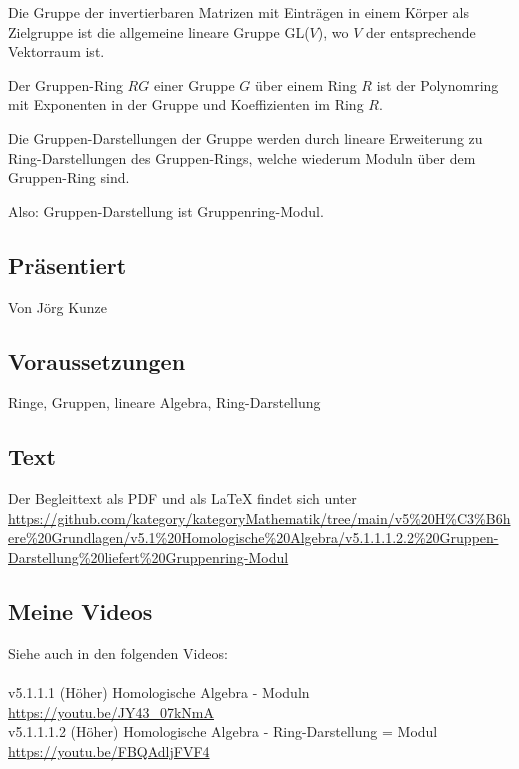 \documentclass[a4paper]{amsart}
\theoremstyle{definition}
\begin{document}
Die Gruppe der invertierbaren Matrizen mit Einträgen in einem Körper als Zielgruppe ist die allgemeine lineare Gruppe GL($V$), wo $V$ der entsprechende Vektorraum ist.

Der Gruppen-Ring $RG$ einer Gruppe $G$ über einem Ring $R$ ist der Polynomring mit Exponenten in der Gruppe und Koeffizienten im Ring $R$.

Die Gruppen-Darstellungen der Gruppe werden durch lineare Erweiterung zu Ring-Darstellungen des Gruppen-Rings, welche wiederum Moduln über dem Gruppen-Ring sind. 

Also: Gruppen-Darstellung ist Gruppenring-Modul.

\subsection*{Präsentiert}
Von Jörg Kunze

\subsection*{Voraussetzungen}
Ringe, Gruppen, lineare Algebra, Ring-Darstellung

\subsection*{Text}
Der Begleittext als PDF und als LaTeX findet sich unter
{\tiny
   \url{https://github.com/kategory/kategoryMathematik/tree/main/v5%20H%C3%B6here%20Grundlagen/v5.1%20Homologische%20Algebra/v5.1.1.1.2.2%20Gruppen-Darstellung%20liefert%20Gruppenring-Modul}
}

\subsection*{Meine Videos}
Siehe auch in den folgenden Videos:\\
\\
v5.1.1.1 (Höher) Homologische Algebra - Moduln\\
\url{https://youtu.be/JY43_07kNmA}
\\
v5.1.1.1.2 (Höher) Homologische Algebra - Ring-Darstellung = Modul\\
\url{https://youtu.be/FBQAdljFVF4}
\end{document}
